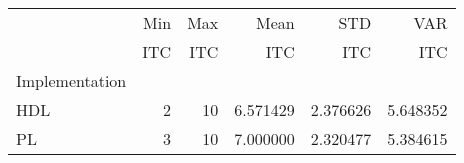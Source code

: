 \begin{tabular}{lrrrrr}
\toprule
{} &              Min &              Max &              Mean &               STD &               VAR \\
{} & ITC & ITC & ITC & ITC & ITC \\
Implementation &                   &                   &                   &                   &                   \\
\midrule
HDL            &                 2 &                10 &          6.571429 &          2.376626 &          5.648352 \\
PL             &                 3 &                10 &          7.000000 &          2.320477 &          5.384615 \\
\bottomrule
\end{tabular}
